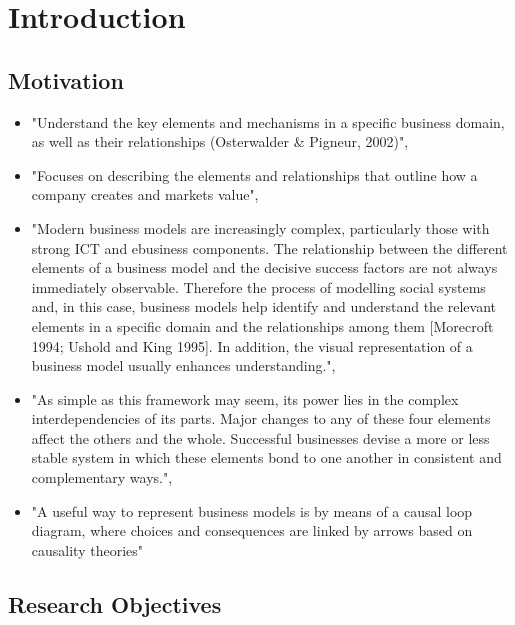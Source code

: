 \chapter{Introduction}\label{ch:intro}

\section{Motivation}\label{ch:intro:mo}

\begin{itemize}
	\item "Understand the key elements and mechanisms in a specific business domain, as well as their relationships (Osterwalder \& Pigneur, 2002)", \citep[p. 303]{Pateli2004}
	\item "Focuses on describing the elements and relationships that outline how a company creates and markets value", \citep[p. 7]{Osterwalder2005}
	\item "Modern business models are increasingly complex, particularly those with strong ICT and ebusiness components. The relationship between the different elements of a business model and the decisive success factors are not always immediately observable. Therefore the process of modelling social systems and, in this case, business models help identify and understand the relevant elements in a specific domain and the relationships among them [Morecroft 1994; Ushold and King 1995]. In addition, the visual representation of a business model usually enhances understanding.", \citep[p. 14]{Osterwalder2005}
	\item "As simple as this framework may seem, its power lies in the complex interdependencies of its parts. Major changes to any of these four elements affect the others and the whole. Successful businesses devise a more or less stable system in which these elements bond to one another in consistent and complementary ways.", \citep[p. 53]{Johnson2008}
	\item "A useful way to represent business models is by means of a causal loop diagram, where choices and consequences are linked by arrows based on causality theories" \citep[p. 198]{Casadesus-Masanell2010}
\end{itemize}


\section{Research Objectives}\label{ch:intro:ro}

